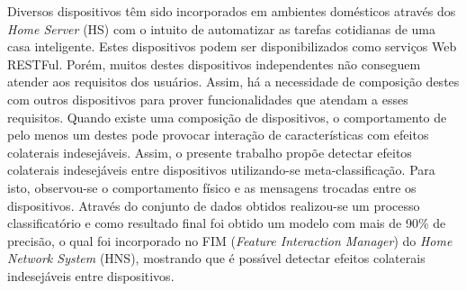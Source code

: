 Diversos dispositivos têm sido incorporados em ambientes domésticos através dos \textit{Home Server} (HS) com o intuito de automatizar as tarefas cotidianas de uma casa inteligente. Estes dispositivos podem ser disponibilizados como serviços Web RESTFul. Porém, muitos destes dispositivos independentes não conseguem atender aos requisitos dos usuários. Assim, há a necessidade de composição destes com outros dispositivos para prover funcionalidades que atendam a esses requisitos. Quando existe uma composição de dispositivos, o comportamento de pelo menos um destes pode provocar interação de características com efeitos colaterais indesejáveis. Assim, o presente trabalho propõe detectar efeitos colaterais indesejáveis entre dispositivos utilizando-se meta-classificação. Para isto, observou-se o comportamento físico e as mensagens trocadas entre os dispositivos. Através do conjunto de dados obtidos realizou-se um processo classificatório e como resultado final foi obtido um modelo com mais de 90\% de precisão, o qual foi incorporado no FIM (\textit{Feature Interaction Manager}) do \textit{Home Network System} (HNS), mostrando que é possı́vel detectar efeitos colaterais indesejáveis entre dispositivos.
